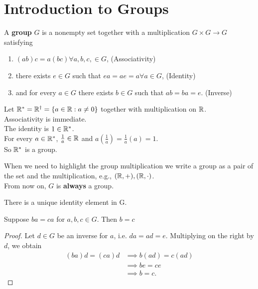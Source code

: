 \chapter{Introduction to Groups}

\begin{definition}[a group]
    A \textbf{group} $G$ is a nonempty set together with a multiplication $G \times G \to G$ satisfying
    \begin{enumerate}
        \item $(ab)c = a(bc) \forall a, b, c, \in G$, (Associativity)
        \item there exists $e \in G$ such that $ea = ae = a \forall a \in G$, (Identity)
        \item and for every $a \in G$ there exists $b \in G$ such that $ab = ba = e$. (Inverse)
    \end{enumerate}
\end{definition}

\begin{example}[a group]
    Let $\mathbb{R}^* = \mathbb{R}^\dag = \left\{a \in \mathbb{R}: a \neq 0\right\}$ together with multiplication on $\mathbb{R}$. \\
    Associativity is immediate. \\
    The identity is $1 \in \mathbb{R}^*$. \\
    For every $a \in \mathbb{R}^*$, $\frac{1}{a} \in \mathbb{R}$ and $a(\frac{1}{a}) = \frac{1}{a}(a) = 1$. \\
    So $\mathbb{R}^*$ is a group.
\end{example}

\begin{remark}
    When we need to highlight the group multiplication we write a group as a pair of the set and the multiplication, e.g., $(\mathbb{R}, +), (\mathbb{R}, \cdot)$. \\
    From now on, $G$ is \textbf{always} a group.
\end{remark}

\begin{theorem}
    There is a unique identity element in G.
\end{theorem}

\begin{theorem}[Cancellation] \label{thm:Cancellation}
    Suppose $ba = ca$ for $a,b,c \in G$. Then $b = c$ 
\end{theorem}
\begin{proof}
    Let $d \in G$ be an inverse for $a$, i.e. $da = ad = e$.
    Multiplying on the right by $d$, we obtain
    \begin{align*}
        (ba)d = (ca)d &\implies b(ad) = c(ad) \\
        &\implies be = ce \\
        &\implies b = c.
    \end{align*}
\end{proof}   

